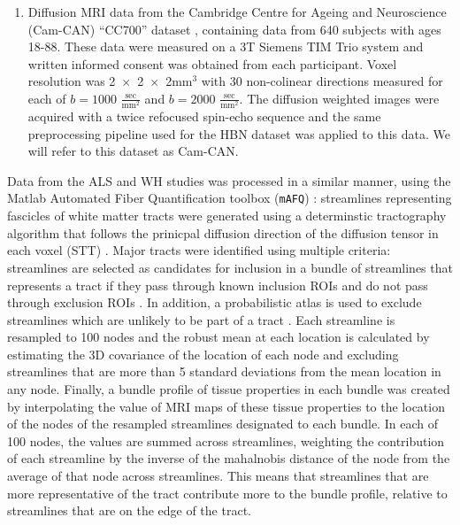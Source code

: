 \documentclass[10pt,letterpaper]{article}
\begin{document}
\begin{enumerate}
Several confounding time-series were calculated based on the
\emph{preprocessed DWI}: framewise displacement (FD) using the implementation
in \emph{Nipype} following the definitions by \cite{power_fd_dvars}. The DWI
time-series were resampled to ACPC, generating a \emph{preprocessed DWI run
in ACPC space}.

Many internal operations of \emph{QSIPrep} use \emph{Nilearn} 0.6.2
\cite[RRID:SCR\_001362]{nilearn} and \emph{DIPY} \cite{dipy}. For more
details of the pipeline, see
\href{https://qsiprep.readthedocs.io/en/latest/workflows.html}{the
section corresponding to workflows in \emph{QSIPrep}'s documentation}.
We will refer to this dataset as HBN.

\item Diffusion MRI data from the Cambridge Centre for Ageing and
Neuroscience (Cam-CAN) ``CC700'' dataset
\cite{shafto2014cambridge,taylor2017cambridge}, containing data from 640
subjects with ages 18-88. These data were measured on a 3T Siemens TIM Trio
system and written informed consent was obtained from each participant. Voxel
resolution was \num{2x2x2}$\text{mm}^3$ with 30 non-colinear directions
measured for each of $b=1000$ $\frac{\text{sec}}{\text{mm}^2}$ and $b=2000$
$\frac{\text{sec}}{\text{mm}^2}$. The diffusion weighted images were acquired
with a twice refocused spin-echo sequence and the same preprocessing pipeline
used for the HBN dataset was applied to this data. We will refer to this
dataset as Cam-CAN.

\end{enumerate}

Data from the ALS and WH studies was processed in a similar manner,
using the Matlab Automated Fiber Quantification toolbox (\texttt{mAFQ})
\cite{yeatman2012tract}: streamlines representing fascicles of white
matter tracts were generated using a determinstic tractography algorithm
that follows the prinicpal diffusion direction of the diffusion tensor
in each voxel (STT) \cite{basser2000vivo}. Major tracts were identified
using multiple criteria: streamlines are selected as candidates for
inclusion in a bundle of streamlines that represents a tract if they
pass through known inclusion ROIs and do not pass through exclusion
ROIs \cite{wakana2007reproducibility}. In addition, a probabilistic
atlas is used to exclude streamlines which are unlikely to be part of
a tract \cite{Hua2008-sh}. Each streamline is resampled to 100 nodes
and the robust mean at each location is calculated by estimating the 3D
covariance of the location of each node and excluding streamlines that
are more than 5 standard deviations from the mean location in any node.
Finally, a bundle profile of tissue properties in each bundle was created
by interpolating the value of MRI maps of these tissue properties to the
location of the nodes of the resampled streamlines designated to each
bundle. In each of 100 nodes, the values are summed across streamlines,
weighting the contribution of each streamline by the inverse of the
mahalnobis distance of the node from the average of that node across
streamlines. This means that streamlines that are more representative of
the tract contribute more to the bundle profile, relative to streamlines
that are on the edge of the tract.
\end{document}
